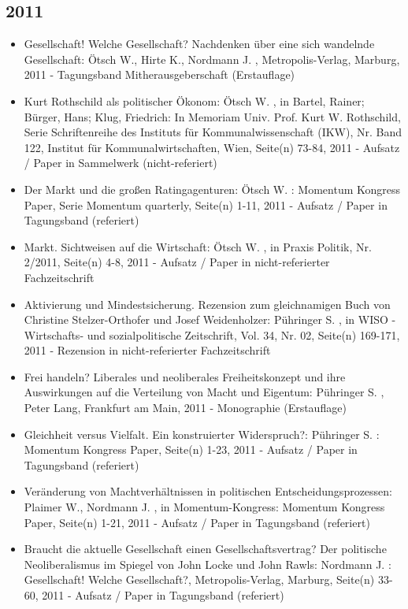  \subsection{2011} 
 \begin{itemize} 
	 \item Gesellschaft! Welche Gesellschaft? Nachdenken über eine sich wandelnde Gesellschaft: Ötsch W., Hirte K., Nordmann J. , Metropolis-Verlag, Marburg, 2011 - Tagungsband Mitherausgeberschaft (Erstauflage)
	 \item Kurt Rothschild als politischer Ökonom: Ötsch W. , in Bartel, Rainer; Bürger, Hans; Klug, Friedrich: In Memoriam Univ. Prof. Kurt W. Rothschild, Serie Schriftenreihe des Instituts für Kommunalwissenschaft (IKW), Nr. Band 122, Institut für Kommunalwirtschaften, Wien, Seite(n) 73-84, 2011 - Aufsatz / Paper in Sammelwerk (nicht-referiert)
	 \item Der Markt und die großen Ratingagenturen: Ötsch W. : Momentum Kongress Paper, Serie Momentum quarterly, Seite(n) 1-11, 2011 - Aufsatz / Paper in Tagungsband (referiert)
	 \item Markt. Sichtweisen auf die Wirtschaft: Ötsch W. , in Praxis Politik, Nr. 2/2011, Seite(n) 4-8, 2011 - Aufsatz / Paper in nicht-referierter Fachzeitschrift
	 \item Aktivierung und Mindestsicherung. Rezension zum gleichnamigen Buch von Christine Stelzer-Orthofer und Josef Weidenholzer: Pühringer S. , in WISO - Wirtschafts- und sozialpolitische Zeitschrift, Vol. 34, Nr. 02, Seite(n) 169-171, 2011 - Rezension in nicht-referierter Fachzeitschrift
	 \item Frei handeln? Liberales und neoliberales Freiheitskonzept und ihre Auswirkungen auf die Verteilung von Macht und Eigentum: Pühringer S. , Peter Lang, Frankfurt am Main, 2011 - Monographie (Erstauflage)
	 \item Gleichheit versus Vielfalt. Ein konstruierter Widerspruch?: Pühringer S. : Momentum Kongress Paper, Seite(n) 1-23, 2011 - Aufsatz / Paper in Tagungsband (referiert)
	 \item Veränderung von Machtverhältnissen in politischen Entscheidungsprozessen: Plaimer W., Nordmann J. , in Momentum-Kongress: Momentum Kongress Paper, Seite(n) 1-21, 2011 - Aufsatz / Paper in Tagungsband (referiert)
	 \item Braucht die aktuelle Gesellschaft einen Gesellschaftsvertrag? Der politische Neoliberalismus im Spiegel von John Locke und John Rawls: Nordmann J. : Gesellschaft! Welche Gesellschaft?, Metropolis-Verlag, Marburg, Seite(n) 33-60, 2011 - Aufsatz / Paper in Tagungsband (referiert)

\end{itemize}
